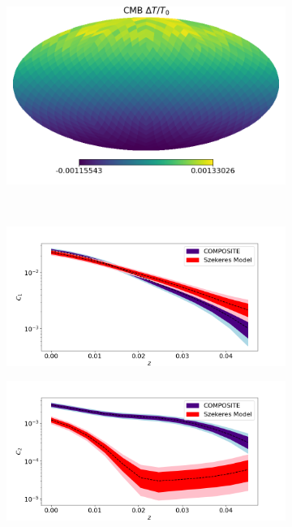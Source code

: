 \documentclass[a4paper,12pt]{report}
\begin{document}
\begin{figure}[p]
    \centering
    \begin{subfigure}[b]{105mm}
        \centering
        \includegraphics[width=\textwidth]{two structures/COMP only MCMC/Best Fit/CMB.png}
        \caption{}
    \end{subfigure}
    \\
    \begin{subfigure}[b]{105mm}
        \centering
        \includegraphics[width=\textwidth]{two structures/COMP only MCMC/Best Fit/Hub C1.png}
        \caption{}
    \end{subfigure}
    \hfill
    \begin{subfigure}[b]{105mm}
        \centering
        \includegraphics[width=\textwidth]{two structures/COMP only MCMC/Best Fit/Hub C2.png}

\end{subfigure}
\end{figure}
\end{document}
